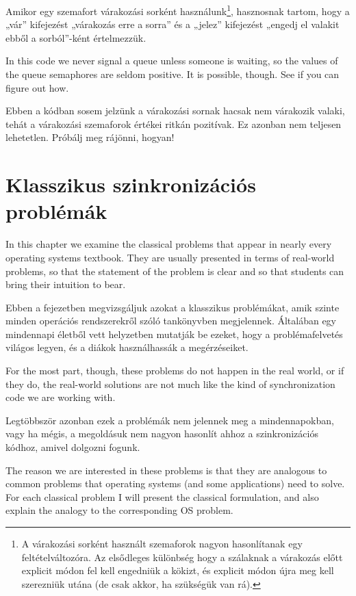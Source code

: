 \documentclass{book}
\newcommand{\clearemptydoublepage}{\newpage\cleardoublepage}
\begin{document}
Amikor egy szemafort várakozási sorként használunk\footnote{A várakozási
sorként használt szemaforok nagyon hasonlítanak egy feltételváltozóra.
Az elsődleges különbség hogy a szálaknak a várakozás előtt explicit módon
fel kell engedniük a kökizt, és explicit módon újra meg kell szerezniük
utána (de csak akkor, ha szükségük van rá).}, hasznosnak tartom,
hogy a „vár” kifejezést „várakozás erre a sorra” és a „jelez”
kifejezést „engedj el valakit ebből a sorból”-ként értelmezzük.

In this code we never signal a queue unless someone is waiting,
so the values of the queue semaphores are seldom positive.
It is possible, though.  See if you can figure out how.

Ebben a kódban sosem jelzünk a várakozási sornak hacsak nem
várakozik valaki, tehát a várakozási szemaforok értékei ritkán
pozitívak. Ez azonban nem teljesen lehetetlen. Próbálj meg
rájönni, hogyan!

\clearemptydoublepage
\chapter{Klasszikus szinkronizációs problémák}

In this chapter we examine the classical problems that appear
in nearly every operating systems textbook.  They
are usually presented in terms of real-world problems, so
that the statement of the problem is clear and so that students
can bring their intuition to bear.

Ebben a fejezetben megvizsgáljuk azokat a klasszikus problémákat,
amik szinte minden operációs rendszerekről szóló tankönyvben megjelennek.
Általában egy mindennapi életből vett helyzetben mutatják
be ezeket, hogy a problémafelvetés világos legyen, és a diákok
használhassák a megérzéseiket.

For the most part, though, these problems do not happen in the
real world, or if they do, the real-world solutions are not much
like the kind of synchronization code we are working with.

Legtöbbször azonban ezek a problémák nem jelennek meg a mindennapokban,
vagy ha mégis, a megoldásuk nem nagyon hasonlít ahhoz a szinkronizációs
kódhoz, amivel dolgozni fogunk.

The reason we are interested in these problems
is that they are analogous to common problems that operating
systems (and some applications) need to solve.  For each classical
problem I will present the classical formulation, and also explain
the analogy to the corresponding OS problem.
\end{document}
